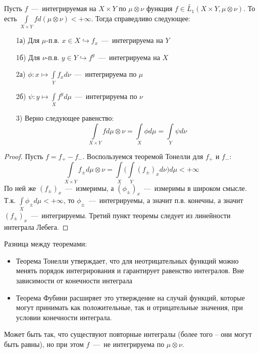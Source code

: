 \begin{theorem}[Фубини]
    Пусть $f$~---~интегрируемая на $X \times Y$ по $\mu \otimes \nu$ функция $f \in \widetilde{L_1}(X \times Y, \mu \otimes \nu)$. То есть $\int\limits_{X\times Y} f d(\mu \otimes \nu) < +\infty$. Тогда справедливо следующее:
    \begin{enumerate}
        \item[1а)] Для $\mu$-п.в. $x \in X \hookrightarrow f_x$~---~интегрируема на $Y$
        \item[1б)] Для $\nu$-п.в. $y \in Y \hookrightarrow f^y$~---~интегрируема на $X$
        \item[2а)] $\phi: x \mapsto \int\limits_Y f_xd\nu$~---~интегрируема по $\mu$
        \item[2б)] $\psi: y \mapsto \int\limits_X f^yd\mu$~---~интегрируема по $\nu$
        \item[3)] Верно следующее равенство: \[\int\limits_{X \times Y}fd\mu\otimes\nu = \int\limits_X \phi d\mu = \int\limits_Y \psi d\nu\]
    \end{enumerate}
\end{theorem}
\begin{proof}
    Пусть $f = f_+ - f_-$. Воспользуемся теоремой Тонелли для $f_+$ и $f_-$: \[\int\limits_{X \times Y}f_\pm d\mu\otimes\nu = \int\limits_X\biggl(\int\limits_Y (f_\pm)_xd\nu \biggr)d\mu < +\infty\]
    По ней же $(f_\pm)_x$~---~измеримы, а $(\phi_\pm)_x$~---~измеримы в широком смысле. Т.к. $\int\limits_X \phi_\pm d\mu < +\infty$, то $\phi_\pm$~---~интегрируемы, а значит п.в. конечны, а значит $(f_\pm)_x$~---~интегрируемы. Третий пункт теоремы следует из линейности интеграла Лебега.
\end{proof}
\begin{note}
    Разница между теоремами:
    \begin{itemize}
        \item     Теорема Тонелли утверждает, что для неотрицательных функций можно менять порядок интегрирования и гарантирует равенство интегралов. Вне зависимости от конечности интеграла
        \item Теорема Фубини расширяет это утверждение на случай функций, которые могут принимать как положительные, так и отрицательные значения, при условии конечности интеграла.
    \end{itemize}
\end{note}
\begin{note}
    Может быть так, что существуют повторные интегралы (более того -- они могут быть равны), но при этом $f$~---~не интегрируема по $\mu \otimes \nu$.
\end{note}
